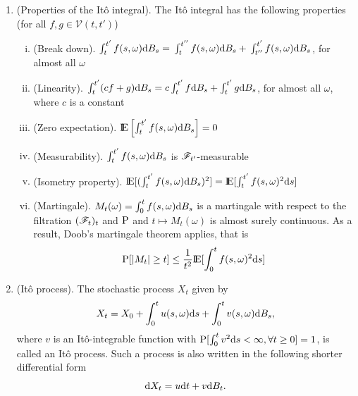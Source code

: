 \documentclass[a4paper,10pt]{scrbook}
\begin{document}
\begin{enumerate}
 \item (Properties of the It\^{o} integral).
       The It\^{o} integral has the following properties (for all \(f, g \in \mathcal{V}(t,t')\))
       \begin{enumerate}[i.]
        \item (Break down). \(\int_{t}^{t'} f(s, \omega) \mathrm{d} B_s 
        {}={} 
        \int_{t}^{t''} f(s, \omega) \mathrm{d} B_s 
        {}+{} 
        \int_{t''}^{t'} f(s, \omega) \mathrm{d} B_s\), 
        for almost all \(\omega\)
        \item (Linearity). \(\int_{t}^{t'} (cf + g) \mathrm{d} B_s = c \int_{t}^{t'} f \mathrm{d} B_s + \int_{t}^{t'} g \mathrm{d} B_s\), 
        for almost all \(\omega\), where \(c\) is a constant
        \item (Zero expectation). \(\E \left[ \int_{t}^{t'} f(s, \omega) \d B_s \right] = 0\)
        \item (Measurability). \(\int_{t}^{t'} f(s, \omega) \mathrm{d} B_s\) is \(\mathscr{F}_{t'}\)-measurable
        \item (\hypertarget{link:ito-isometry}{Isometry} property). \(\E[(\int_{t}^{t'} f(s, \omega) \d B_s)^2] 
        {}={} \E[\int_{t}^{t'} f(s, \omega)^2 \d s]\)
        \item (Martingale). \(M_t(\omega) = \int_{0}^{t} f(s, \omega) \mathrm{d} B_s\) is a martingale with respect to 
              the filtration \((\mathscr{F}_t)_t\) and \(\mathrm{P}\) and \(t \mapsto M_t(\omega)\) is almost surely continuous. 
              As a result, Doob's martingale theorem applies, that is 
              \[
               \prob[|M_t| \geq  t] \leq \frac{1}{t^2}\E[\int_{0}^{t} f(s, \omega)^2 \d s]
              \]

       \end{enumerate}

       
 \item (It\^{o} process). The stochastic process \(X_t\) given by 
       \[
        X_t = X_0 + \int_0^t u(s, \omega)\mathrm{d} s + \int_0^t v(s, \omega) \mathrm{d} B_s,
       \]
       where \(v\) is an It\^o-integrable function with \(\mathrm{P}[\int_0^t v^2 \mathrm{d} s < \infty, \forall t \geq 0] = 1\), 
       is called an It\^{o} process.
       Such a process is also written in the following shorter differential form
       \[
        \mathrm{d} X_t = u \mathrm{d} t + v \mathrm{d} B_t.
       \]
       

\end{enumerate}
\end{document}
